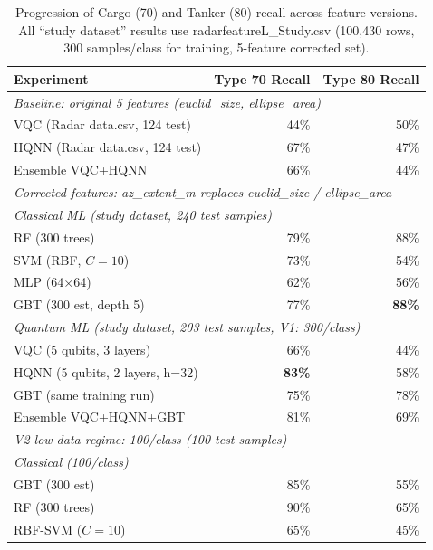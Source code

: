 \documentclass[journal]{IEEEtran}
\begin{document}
\begin{table}[H]
\centering
\caption{Progression of Cargo (70) and Tanker (80) recall across feature versions.
         All ``study dataset'' results use radarfeatureL\_Study.csv
         (100,430 rows, 300 samples/class for training, 5-feature corrected set).}
\label{tab:recall_progression}
\begin{tabular}{p{7.5cm}rr}
\toprule
\textbf{Experiment} & \textbf{Type 70 Recall} & \textbf{Type 80 Recall} \\
\midrule
\multicolumn{3}{l}{\textit{Baseline: original 5 features (euclid\_size, ellipse\_area)}} \\
VQC (Radar data.csv, 124 test)    & 44\% & 50\% \\
HQNN (Radar data.csv, 124 test)   & 67\% & 47\% \\
Ensemble VQC+HQNN                 & 66\% & 44\% \\
\midrule
\multicolumn{3}{l}{\textit{Corrected features: az\_extent\_m replaces euclid\_size / ellipse\_area}} \\
\multicolumn{3}{l}{\quad\textit{Classical ML (study dataset, 240 test samples)}} \\
RF  (300 trees)                   & 79\% & 88\% \\
SVM (RBF, $C=10$)                 & 73\% & 54\% \\
MLP (64$\times$64)                & 62\% & 56\% \\
GBT (300 est, depth 5)            & 77\% & \textbf{88\%} \\
\multicolumn{3}{l}{\quad\textit{Quantum ML (study dataset, 203 test samples, V1: 300/class)}} \\
VQC  (5 qubits, 3 layers)         & 66\% & 44\% \\
HQNN (5 qubits, 2 layers, h=32)   & \textbf{83\%} & 58\% \\
GBT  (same training run)          & 75\% & 78\% \\
Ensemble VQC+HQNN+GBT             & 81\% & 69\% \\
\midrule
\multicolumn{3}{l}{\textit{V2 low-data regime: 100/class (100 test samples)}} \\
\multicolumn{3}{l}{\quad\textit{Classical (100/class)}} \\
GBT (300 est)                     & 85\% & 55\% \\
RF  (300 trees)                   & 90\% & 65\% \\
RBF-SVM ($C=10$)                  & 65\% & 45\% \\

\end{tabular}
\end{table}
\end{document}
